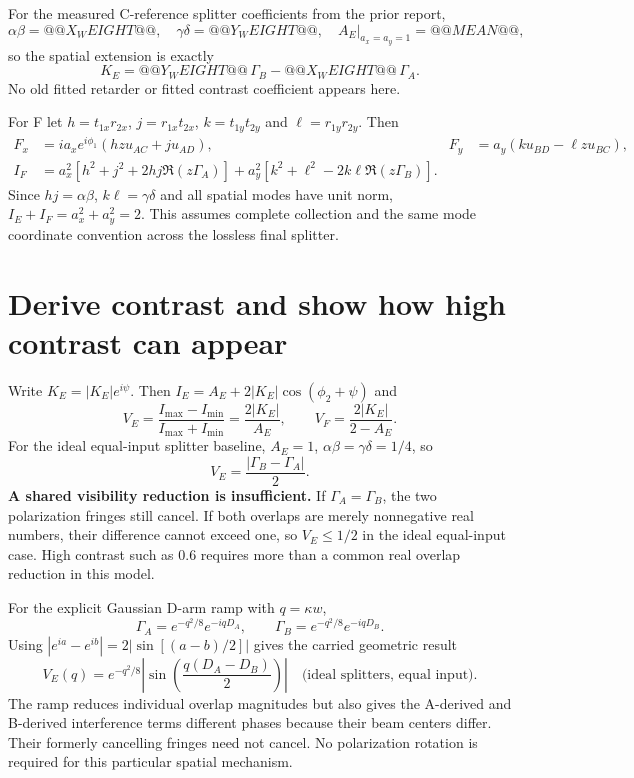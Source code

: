 \documentclass[11pt,a4paper]{article}
\begin{document}
For the measured C-reference splitter coefficients from the prior report,
\[
\alpha\beta=@@X_WEIGHT@@,\quad\gamma\delta=@@Y_WEIGHT@@,\quad
A_E\big|_{a_x=a_y=1}=@@MEAN@@,
\]
so the spatial extension is exactly
\begin{equation}
K_E=@@Y_WEIGHT@@\,\Gamma_B-@@X_WEIGHT@@\,\Gamma_A.
\end{equation}
No old fitted retarder or fitted contrast coefficient appears here.

For F let $h=t_{1x}r_{2x}$, $j=r_{1x}t_{2x}$,
$k=t_{1y}t_{2y}$ and $\ell=r_{1y}r_{2y}$. Then
\begin{align}
F_x&=ia_xe^{i\phi_1}(hz u_{AC}+ju_{AD}),&
F_y&=a_y(ku_{BD}-\ell z u_{BC}),\\
I_F&=a_x^2[h^2+j^2+2hj\Re(z\Gamma_A)]
+a_y^2[k^2+\ell^2-2k\ell\Re(z\Gamma_B)].
\end{align}
Since $hj=\alpha\beta$, $k\ell=\gamma\delta$ and all spatial modes have unit
norm, $I_E+I_F=a_x^2+a_y^2=2$. This assumes complete collection and the same
mode coordinate convention across the lossless final splitter.

\section{Derive contrast and show how high contrast can appear}
Write $K_E=|K_E|e^{i\psi}$. Then
$I_E=A_E+2|K_E|\cos(\phi_2+\psi)$ and
\begin{equation}
\boxed{V_E=\frac{I_{\max}-I_{\min}}{I_{\max}+I_{\min}}
=\frac{2|K_E|}{A_E}},\qquad V_F=\frac{2|K_E|}{2-A_E}.
\end{equation}
For the ideal equal-input splitter baseline, $A_E=1$,
$\alpha\beta=\gamma\delta=1/4$, so
\begin{equation}
\boxed{V_E=\frac{|\Gamma_B-\Gamma_A|}{2}.}
\end{equation}
\textbf{A shared visibility reduction is insufficient.} If
$\Gamma_A=\Gamma_B$, the two polarization fringes still cancel. If both overlaps
are merely nonnegative real numbers, their difference cannot exceed one, so
$V_E\le1/2$ in the ideal equal-input case. High contrast such as 0.6 requires
more than a common real overlap reduction in this model.

For the explicit Gaussian D-arm ramp with $q=\kappa w$,
\[
\Gamma_A=e^{-q^2/8}e^{-iqD_A},\qquad
\Gamma_B=e^{-q^2/8}e^{-iqD_B}.
\]
Using $|e^{ia}-e^{ib}|=2|\sin[(a-b)/2]|$ gives the carried geometric result
\begin{equation}
\boxed{V_E(q)=e^{-q^2/8}
\left|\sin\!\left(\frac{q(D_A-D_B)}{2}\right)\right|}
\quad\text{(ideal splitters, equal input).}
\end{equation}
The ramp reduces individual overlap magnitudes but also gives the A-derived
and B-derived interference terms different phases because their beam centers
differ. Their formerly cancelling fringes need not cancel. No polarization
rotation is required for this particular spatial mechanism.
\end{document}
